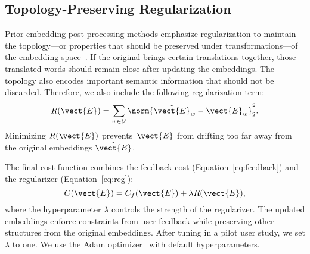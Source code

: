 \subsection{Topology-Preserving Regularization}

Prior embedding post-processing methods emphasize regularization to maintain
the topology---or properties that should be preserved under transformations---of
the embedding space~\citep{mrksic-16,mrksic-17,glavas-18}.
If the original  brings certain translations together, those
translated words should remain close after updating the embeddings.
The topology also encodes important semantic information that should not be
discarded.
Therefore, we also include the following regularization term:
\begin{equation}
  R(\vect{E}) =  \sum_{w \in \mathcal{V}} \norm{\hat{\vect{E}}_w - \vect{E}_w}_2^2. \label{eq:reg}
\end{equation}
Minimizing $R(\vect{E})$ prevents~$\vect{E}$ from drifting too far away from the original embeddings $\hat{\vect{E}}$.

The final cost function combines the feedback cost (Equation~\ref{eq:feedback}) and the regularizer (Equation~\ref{eq:reg}):
\begin{equation}
    C(\vect{E}) = C_f(\vect{E}) + \lambda R(\vect{E}), \label{eq:cost}
\end{equation}
where the hyperparameter $\lambda$ controls the strength of the regularizer.
The updated embeddings enforce constraints from user feedback while
preserving other structures from the original embeddings.
After tuning in a pilot user study, we set $\lambda$ to one.
We use the Adam optimizer~\citep{kingma-15} with default hyperparameters.
